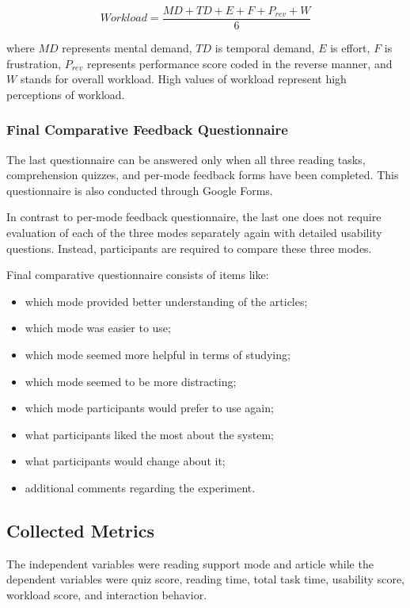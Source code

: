 \documentclass{IEEEtran}
\begin{document}
\begin{equation}
Workload = \frac{MD + TD + E + F + P_{rev} + W}{6}
\end{equation}

where $MD$ represents mental demand, $TD$ is temporal demand, $E$ is effort, $F$ is frustration, $P_{rev}$ represents performance score coded in the reverse manner, and $W$ stands for overall workload. High values of workload represent high perceptions of workload.

\subsubsection{Final Comparative Feedback Questionnaire}

The last questionnaire can be answered only when all three reading tasks, comprehension quizzes, and per-mode feedback forms have been completed. This questionnaire is also conducted through Google Forms.

In contrast to per-mode feedback questionnaire, the last one does not require evaluation of each of the three modes separately again with detailed usability questions. Instead, participants are required to compare these three modes.

Final comparative questionnaire consists of items like:

\begin{itemize}
    \item which mode provided better understanding of the articles;
    \item which mode was easier to use;
    \item which mode seemed more helpful in terms of studying;
    \item which mode seemed to be more distracting;
     \item which mode participants would prefer to use again;
     \item what participants liked the most about the system;
    \item what participants would change about it;
    \item additional comments regarding the experiment.
    
\end{itemize}

\subsection{Collected Metrics}

The independent variables were reading support mode and article while the dependent variables were quiz score, reading time, total task time, usability score, workload score, and interaction behavior.
\end{document}
